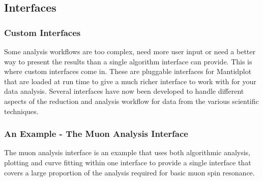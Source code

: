 \documentclass[letterpaper,10pt,english,openany]{sphinxmanual}
\let\sphinxpxdimen\pdfpxdimen\else\newdimen\sphinxpxdimen
\begin{document}
\subsection{Interfaces}
\label{\detokenize{mantid_basic_course/algorithms_workspaces_and_histories/05_interfaces:interfaces}}\label{\detokenize{mantid_basic_course/algorithms_workspaces_and_histories/05_interfaces:id1}}\label{\detokenize{mantid_basic_course/algorithms_workspaces_and_histories/05_interfaces::doc}}

\subsubsection{Custom Interfaces}
\label{\detokenize{mantid_basic_course/algorithms_workspaces_and_histories/05_interfaces:custom-interfaces}}
Some analysis workflows are too complex, need more
user input or need a better way to present the results than a single
algorithm interface can provide. This is where custom interfaces come
in. These are pluggable interfaces for Mantidplot that are loaded at run
time to give a much richer interface to work with for your data
analysis. Several interfaces have now been developed to handle different
aspects of the reduction and analysis workflow for data from the various
scientific techniques.


\subsubsection{An Example - The Muon Analysis Interface}
\label{\detokenize{mantid_basic_course/algorithms_workspaces_and_histories/05_interfaces:an-example-the-muon-analysis-interface}}
The muon analysis interface is an example that uses both algorithmic
analysis, plotting and curve fitting within one interface to provide a
single interface that covers a large proportion of the analysis required
for basic muon spin resonance.

\begin{figure}[H]
\centering

\noindent\sphinxincludegraphics[width=400\sphinxpxdimen]{{MuonAnalysisInterface}.png}
\end{figure}
\end{document}
